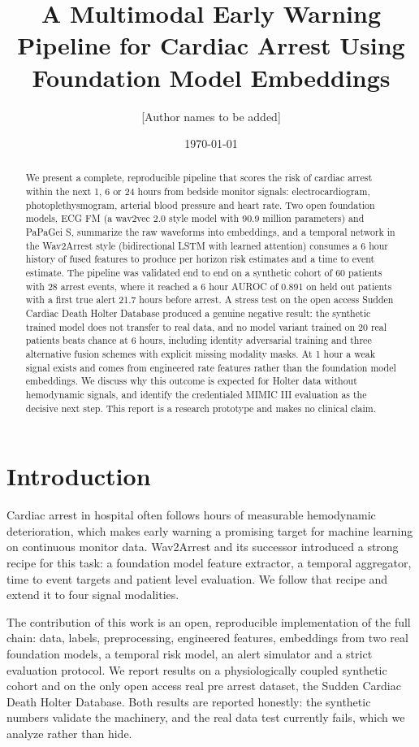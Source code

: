 \documentclass[11pt]{article}
\title{A Multimodal Early Warning Pipeline for Cardiac Arrest Using Foundation Model Embeddings}
\author{[Author names to be added]}
\date{\today}
\begin{document}
\maketitle

\begin{abstract}
We present a complete, reproducible pipeline that scores the risk of cardiac arrest
within the next 1, 6 or 24 hours from bedside monitor signals: electrocardiogram,
photoplethysmogram, arterial blood pressure and heart rate. Two open foundation
models, ECG FM (a wav2vec 2.0 style model with 90.9 million parameters) and PaPaGei S,
summarize the raw waveforms into embeddings, and a temporal network in the Wav2Arrest
style (bidirectional LSTM with learned attention) consumes a 6 hour history of fused
features to produce per horizon risk estimates and a time to event estimate.
The pipeline was validated end to end on a synthetic cohort of 60 patients with 28
arrest events, where it reached a 6 hour AUROC of 0.891 on held out patients with a
first true alert 21.7 hours before arrest. A stress test on the open access Sudden
Cardiac Death Holter Database produced a genuine negative result: the synthetic
trained model does not transfer to real data, and no model variant trained on 20
real patients beats chance at 6 hours, including identity adversarial training and
three alternative fusion schemes with explicit missing modality masks. At 1 hour a
weak signal exists and comes from engineered rate features rather than the
foundation model embeddings. We discuss why this outcome is expected for Holter
data without hemodynamic signals, and identify the credentialed MIMIC III
evaluation as the decisive next step. This report is a research prototype and makes
no clinical claim.
\end{abstract}

\section{Introduction}
Cardiac arrest in hospital often follows hours of measurable hemodynamic
deterioration, which makes early warning a promising target for machine learning on
continuous monitor data. Wav2Arrest and its successor introduced a strong recipe for
this task: a foundation model feature extractor, a temporal aggregator, time to
event targets and patient level evaluation. We follow that recipe and extend it to
four signal modalities.

The contribution of this work is an open, reproducible implementation of the full
chain: data, labels, preprocessing, engineered features, embeddings from two real
foundation models, a temporal risk model, an alert simulator and a strict
evaluation protocol. We report results on a physiologically coupled synthetic
cohort and on the only open access real pre arrest dataset, the Sudden Cardiac
Death Holter Database. Both results are reported honestly: the synthetic numbers
validate the machinery, and the real data test currently fails, which we analyze
rather than hide.
\end{document}
